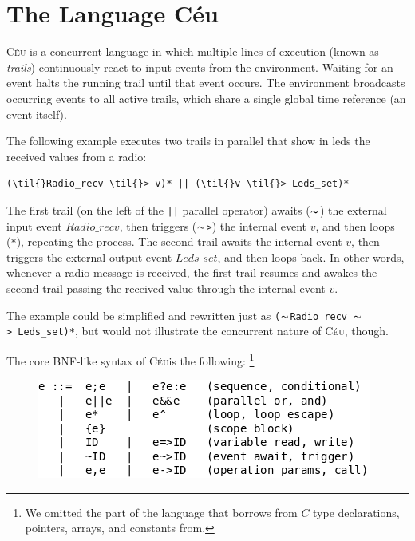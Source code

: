 \documentclass[10pt]{sigplan-proc-varsize-sensys11}
\newcommand{\2}{\;\;}
\newcommand{\5}{\;\;\;\;\;}
\newcommand{\til}{$\thicksim$}
\newcommand{\CEU}{\textsc{C\'{e}u}}
\newcommand{\code}[1] {{\small{\texttt{#1}}}}
\begin{document}
\section{The Language C\'eu}
\label{sec.lang}

\CEU{} is a concurrent language in which multiple lines of execution (known as 
\emph{trails}) continuously react to input events from the environment.
Waiting for an event halts the running trail until that event occurs.
The environment broadcasts occurring events to all active trails, which share a 
single global time reference (an event itself).

The following example executes two trails in parallel that show in leds the 
received values from a radio:

\begin{Verbatim}[commandchars=\\\{\}]
    (\til{}Radio_recv \til{}> v)* || (\til{}v \til{}> Leds_set)*
\end{Verbatim}

The first trail (on the left of the \code{||} parallel operator) awaits 
(\code{\til}) the external input event $Radio\_recv$, then triggers 
(\code{\til>}) the internal event $v$, and then loops (\code{*}), repeating the 
process.
The second trail awaits the internal event $v$, then triggers the external 
output event $Leds\_set$, and then loops back.
In other words, whenever a radio message is received, the first trail resumes 
and awakes the second trail passing the received value through the internal 
event $v$.

The example could be simplified and rewritten just as
    \code{(\til{}Radio\_recv~\til{}>~Leds\_set)*},
but would not illustrate the concurrent nature of \CEU{}, though.

\newpage

The core BNF-like syntax of \CEU is the following:%
\footnote{We omitted the part of the language that borrows from $C$ type 
declarations, pointers, arrays, and constants from.}

\begin{figure}[ht]
\centering
\includegraphics[scale=0.40]{figs/syntax.png}
\end{figure}
\end{document}
